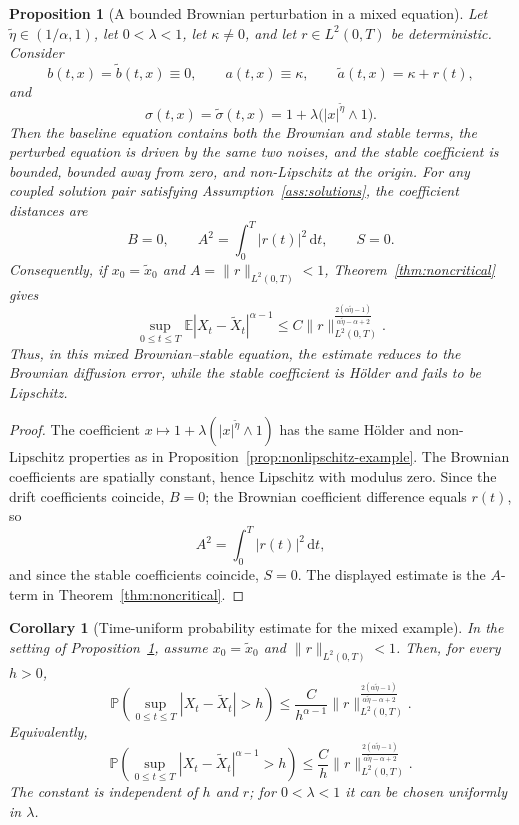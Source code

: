 \documentclass[10pt,a4paper]{amsart}
\newtheorem{proposition}[theorem]{Proposition}
\newtheorem{corollary}[theorem]{Corollary}
\newcommand{\E}{\mathbb{E}}
\newcommand{\1}{\mathbf{1}}
\newcommand{\dd}{\,\mathrm{d}}
\newcommand{\wt}{\tilde}
\begin{document}
\begin{proposition}[A bounded Brownian perturbation in a mixed equation]\label{prop:mixed-brownian-error}
Let $\wt\eta\in(1/\alpha,1)$, let $0<\lambda<1$, let $\kappa\ne0$, and let $r\in L^2(0,T)$ be deterministic. Consider
\[
  b(t,x)=\wt b(t,x)\equiv0,
  \qquad
  a(t,x)\equiv\kappa,
  \qquad
  \wt a(t,x)=\kappa+r(t),
\]
and
\[
  \sigma(t,x)=\wt\sigma(t,x)=1+\lambda\bigl(|x|^{\wt\eta}\wedge1\bigr).
\]
Then the baseline equation contains both the Brownian and stable terms, the perturbed equation is driven by the same two noises, and the stable coefficient is bounded, bounded away from zero, and non-Lipschitz at the origin. For any coupled solution pair satisfying Assumption~\ref{ass:solutions}, the coefficient distances are
\[
  B=0,
  \qquad
  A^2=\int_0^T |r(t)|^2\dd t,
  \qquad
  S=0.
\]
Consequently, if $x_0=\wt x_0$ and $A=\|r\|_{L^2(0,T)}<1$, Theorem~\ref{thm:noncritical} gives
\[
  \sup_{0\le t\le T}\E|X_t-\wt X_t|^{\alpha-1}
  \le C\|r\|_{L^2(0,T)}^{\frac{2(\alpha\wt\eta-1)}{\alpha\wt\eta-\alpha+2}}.
\]
Thus, in this mixed Brownian--stable equation, the estimate reduces to the Brownian diffusion error, while the stable coefficient is H\"older and fails to be Lipschitz.
\end{proposition}

\begin{proof}
The coefficient $x\mapsto1+\lambda(|x|^{\wt\eta}\wedge1)$ has the same H\"older and non-Lipschitz properties as in Proposition~\ref{prop:nonlipschitz-example}. The Brownian coefficients are spatially constant, hence Lipschitz with modulus zero. Since the drift coefficients coincide, $B=0$; the Brownian coefficient difference equals $r(t)$, so
\[
  A^2=\int_0^T|r(t)|^2\dd t,
\]
and since the stable coefficients coincide, $S=0$. The displayed estimate is the $A$-term in Theorem~\ref{thm:noncritical}.
\end{proof}

\begin{corollary}[Time-uniform probability estimate for the mixed example]\label{cor:mixed-example-probability}
In the setting of Proposition~\ref{prop:mixed-brownian-error}, assume $x_0=\wt x_0$ and $\|r\|_{L^2(0,T)}<1$. Then, for every $h>0$,
\[
  \mathbb P\left(\sup_{0\le t\le T}|X_t-\wt X_t|>h\right)
  \le
  \frac{C}{h^{\alpha-1}}
  \|r\|_{L^2(0,T)}^{\frac{2(\alpha\wt\eta-1)}{\alpha\wt\eta-\alpha+2}}.
\]
Equivalently,
\[
  \mathbb P\left(\sup_{0\le t\le T}|X_t-\wt X_t|^{\alpha-1}>h\right)
  \le
  \frac{C}{h}
  \|r\|_{L^2(0,T)}^{\frac{2(\alpha\wt\eta-1)}{\alpha\wt\eta-\alpha+2}}.
\]
The constant is independent of $h$ and $r$; for $0<\lambda<1$ it can be chosen uniformly in $\lambda$.
\end{corollary}
\end{document}
